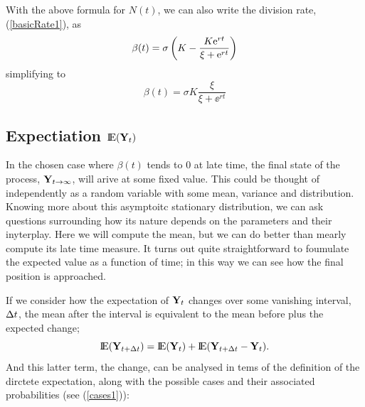 \noindent
With the above formula for $N(t)$, we can also write the division rate, (\ref{basicRate1}), as 
$$\beta(t) = \sigma\left( K - \frac{K{\rm e}^{rt}}{\xi + {\rm e}^{rt}}\right)$$
simplifying to 
$$\beta(t) = \sigma K \frac{\xi}{\xi + \ee^{rt}}$$


\subsection{Expectiation ${\rm I}\!{\rm E}({{\bf Y}_t})$}
In the chosen case where $\beta(t)$ tends to 0 at late time, the final state of the process, ${\bf Y}_{t\to\infty}$, will arive at some fixed value. This could be thought of independently as a random variable with some mean, variance and distribution. Knowing more about this asymptoitc stationary distribution, we can ask questions surrounding how its nature depends on the parameters and their inyterplay. Here we will compute the mean, but we can do better than mearly compute its late time measure. It turns out quite straightforward to foumulate the expected value as a function of time; in this way we can see how the final position is approached. \par

If we consider how the expectation of ${\bf Y}_t$ changes over some vanishing interval, $\Delta t$, the mean after the interval is equivalent to the mean before plus the expected change;
\begin{equation}
\label{ExpectChange1} 
{\rm I}\!{\rm E}({\bf Y}_{t+\Delta t}) = {\rm I}\!{\rm E}({{\bf Y}_t}) + {\rm I}\!{\rm E}({\bf Y}_{t+\Delta t} - {\bf Y}_t).
\end{equation}
And this latter term, the change, can be analysed in tems of the definition of the dirctete expectation, along with the possible cases and their associated probabilities (see (\ref{cases1})):

